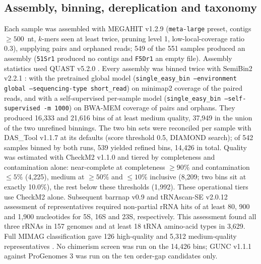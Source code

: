 \subsection*{Assembly, binning, dereplication and taxonomy}
Each sample was assembled with MEGAHIT v1.2.9 \citep{li2015megahit} (\texttt{meta-large} preset,
contigs $\geq 500$~nt, $k$-mers seen at least twice, pruning level 1, low-local-coverage ratio 0.3),
supplying pairs and orphaned reads; 549 of the 551 samples produced an assembly (\texttt{51Sr1}
produced no contigs and \texttt{F5Dr1} an empty file). Assembly statistics used QUAST v5.2.0
\citep{gurevich2013quast}. Every assembly was binned twice with SemiBin2 v2.2.1
\citep{pan2023semibin2}: with the pretrained global model (\texttt{single\_easy\_bin --environment
global --sequencing-type short\_read}) on minimap2 \citep{li2018minimap2} coverage of the paired
reads, and with a self-supervised per-sample model (\texttt{single\_easy\_bin --self-supervised -m
1000}) on BWA-MEM \citep{li2013bwamem} coverage of pairs and orphans. They produced 16{,}333 and
21{,}616 bins of at least medium quality, 37{,}949 in the union of the two unrefined binnings. The
two bin sets were reconciled per sample with DAS\_Tool v1.1.7 \citep{sieber2018dastool} at its
defaults (score threshold 0.5, DIAMOND search); of 542 samples binned by both runs, 539 yielded
refined bins, 14{,}426 in total. Quality was estimated with CheckM2 v1.1.0 \citep{chklovski2023checkm2}
and tiered by completeness and contamination alone: near-complete at completeness $\geq 90\%$ and
contamination $\leq 5\%$ (4{,}225), medium at $\geq 50\%$ and $\leq 10\%$ inclusive (8{,}209; two
bins sit at exactly 10.0\%), the rest below these thresholds (1{,}992). These operational tiers use CheckM2 alone. Subsequent barrnap v0.9 and tRNAscan-SE v2.0.12 \citep{chan2021trnascan} assessment of representatives required non-partial rRNA hits of at least 80, 900 and 1{,}900 nucleotides for 5S, 16S and 23S, respectively. This assessment found all three rRNAs in 157 genomes and at least 18 tRNA amino-acid types in 3{,}629. Full MIMAG classification gave 126 high-quality and 5{,}312 medium-quality representatives \citep{bowers2017mimag}. No chimerism screen was
run on the 14{,}426 bins; GUNC v1.1.1 \citep{orakov2021gunc} against ProGenomes 3 was run on the ten
order-gap candidates only.


